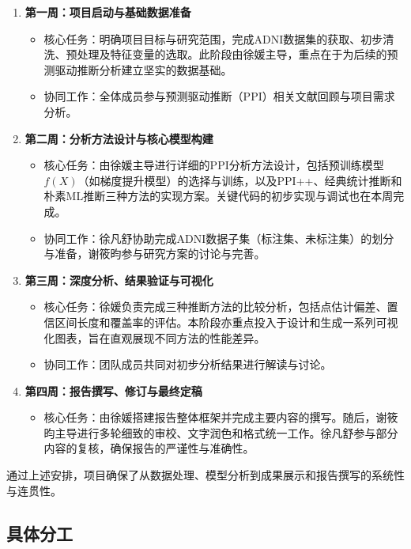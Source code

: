 \documentclass[12pt,a4paper]{article}
\begin{document}
\begin{enumerate}
    \item \textbf{第一周：项目启动与基础数据准备}
    \begin{itemize}
        \item 核心任务：明确项目目标与研究范围，完成ADNI数据集的获取、初步清洗、预处理及特征变量的选取。此阶段由徐媛主导，重点在于为后续的预测驱动推断分析建立坚实的数据基础。
        \item 协同工作：全体成员参与预测驱动推断（PPI）相关文献回顾与项目需求分析。
    \end{itemize}

    \item \textbf{第二周：分析方法设计与核心模型构建}
    \begin{itemize}
        \item 核心任务：由徐媛主导进行详细的PPI分析方法设计，包括预训练模型$f(X)$（如梯度提升模型）的选择与训练，以及PPI++、经典统计推断和朴素ML推断三种方法的实现方案。关键代码的初步实现与调试也在本周完成。
        \item 协同工作：徐凡舒协助完成ADNI数据子集（标注集、未标注集）的划分与准备，谢筱昀参与研究方案的讨论与完善。
    \end{itemize}

    \item \textbf{第三周：深度分析、结果验证与可视化}
    \begin{itemize}
        \item 核心任务：徐媛负责完成三种推断方法的比较分析，包括点估计偏差、置信区间长度和覆盖率的评估。本阶段亦重点投入于设计和生成一系列可视化图表，旨在直观展现不同方法的性能差异。
        \item 协同工作：团队成员共同对初步分析结果进行解读与讨论。
    \end{itemize}

    \item \textbf{第四周：报告撰写、修订与最终定稿}
    \begin{itemize}
        \item 核心任务：由徐媛搭建报告整体框架并完成主要内容的撰写。随后，谢筱昀主导进行多轮细致的审校、文字润色和格式统一工作。徐凡舒参与部分内容的复核，确保报告的严谨性与准确性。
    \end{itemize}
\end{enumerate}

通过上述安排，项目确保了从数据处理、模型分析到成果展示和报告撰写的系统性与连贯性。

\subsection{具体分工}
\end{document}
